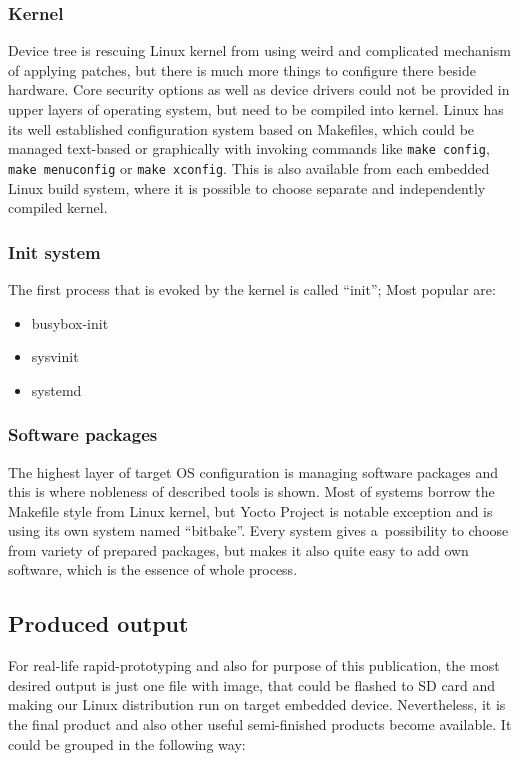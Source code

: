 \documentclass[printmode]{mgr}
\begin{document}
\subsubsection{Kernel}
Device tree is rescuing Linux kernel from using weird and complicated mechanism of applying patches, but there is much more things to configure there beside hardware.
Core security options as well as device drivers could not be provided in upper layers of operating system, but need to be compiled into kernel.
Linux has its well established configuration system based on Makefiles, which could be managed text-based or graphically with invoking commands like \verb|make config|, \verb|make menuconfig| or \verb|make xconfig|.
This is also available from each embedded Linux build system, where it is possible to choose separate and independently compiled kernel.

\subsubsection{Init system}

The first process that is evoked by the kernel is called ``init''; Most popular are:

\begin{itemize}
    \item busybox-init
    \item sysvinit
    \item systemd
\end{itemize}

\subsubsection{Software packages}
The highest layer of target OS configuration is managing software packages and this is where nobleness of described tools is shown.
Most of systems borrow the Makefile style from Linux kernel, but Yocto Project is notable exception and is using its own system named ``bitbake''.
Every system gives a~possibility to choose from variety of prepared packages, but makes it also quite easy to add own software, which is the essence of whole process.

\subsection{Produced output}

For real-life rapid-prototyping and also for purpose of this publication, the most desired output is just one file with image, that could be flashed to SD card and making our Linux distribution run on target embedded device.
Nevertheless, it is the final product and also other useful semi-finished products become available.
It could be grouped in the following way:
\end{document}
